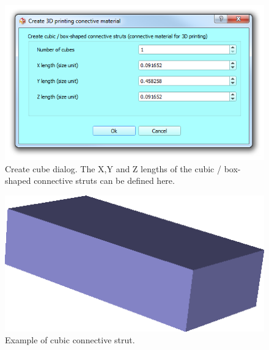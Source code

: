 \begin{figure}
  \centering
  \includegraphics[scale=0.5]{images/09/create_3D_printing_support_surfaces/cubes_dialog.png} 
	\caption{Create cube dialog. The X,Y and Z lengths of the cubic / box-shaped connective struts can be defined here.}
 \label{cubes_dialog}
\end{figure}

\begin{figure}
  \centering
  \includegraphics[scale=0.5]{images/09/create_3D_printing_support_surfaces/cubic.png} 
	\caption{Example of cubic connective strut.}
 \label{cubic}
\end{figure}


